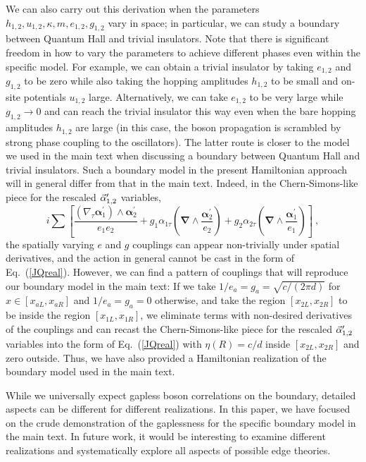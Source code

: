 We can also carry out this derivation when the parameters $h_{1,2}, u_{1,2}, \kappa, m, e_{1,2}, g_{1,2}$ vary in space; in particular, we can study a boundary between Quantum Hall and trivial insulators.
Note that there is significant freedom in how to vary the parameters to achieve different phases even within the specific model.  For example, we can obtain a trivial insulator by taking $e_{1,2}$ and $g_{1,2}$ to be zero while also taking the hopping amplitudes $h_{1,2}$ to be small and on-site potentials $u_{1,2}$ large.
Alternatively, we can take $e_{1,2}$ to be very large while $g_{1,2} \to 0$ and can reach the trivial insulator this way even when the bare hopping amplitudes $h_{1,2}$ are large (in this case, the boson propagation is scrambled by strong phase coupling to the oscillators).  The latter route is closer to the model we used in the main text when discussing a boundary between Quantum Hall and trivial insulators.  Such a boundary model in the present Hamiltonian approach will in general differ from that in the main text.  Indeed, in the Chern-Simons-like piece for the rescaled ${\vec{\alpha}}^\prime_{1,2}$ variables,
\begin{equation*}
i \sum [ \frac{(\nabla_\tau {\bm \alpha}^\prime_1) \wedge {\bm \alpha}^\prime_2}{e_1 e_2} + g_1 \alpha_{1\tau} ({\bm \nabla} \wedge \frac{{\bm \alpha}^\prime_2}{e_2}) + g_2 \alpha_{2\tau} ({\bm \nabla} \wedge \frac{{\bm \alpha}^\prime_1}{e_1}) ] ~,
\end{equation*}
the spatially varying $e$ and $g$ couplings can appear non-trivially under spatial derivatives, and the action in general cannot be cast in the form of Eq.~(\ref{JQreal}).  However, we can find a pattern of couplings that will reproduce our boundary model in the main text:  If we take $1/e_a = g_a = \sqrt{c/(2\pi d)}$ for $x\in [x_{aL}, x_{aR}]$ and $1/e_a = g_a = 0$ otherwise, and take the region $[x_{2L}, x_{2R}]$ to be inside the region $[x_{1L}, x_{1R}]$, we eliminate terms with non-desired derivatives of the couplings and can recast the Chern-Simons-like piece for the rescaled ${\vec{\alpha}}^\prime_{1,2}$ variables into the form of Eq.~(\ref{JQreal}) with $\eta(R) = c/d$ inside $[x_{2L}, x_{2R}]$ and zero outside.  Thus, we have also provided a Hamiltonian realization of the boundary model used in the main text.

While we universally expect gapless boson correlations on the boundary, detailed aspects can be different for different realizations.  In this paper, we have focused on the crude demonstration of the gaplessness for the specific boundary model in the main text.  In future work, it would be interesting to examine different realizations and systematically explore all aspects of possible edge theories.

